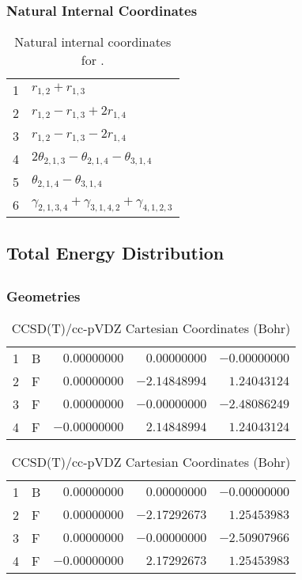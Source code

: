 \documentclass[10pt,oneside]{article}
\begin{document}
\begin{table}[h!]
\subsubsection*{Natural Internal Coordinates}
\centering
\caption{Natural internal coordinates for .}
\small
\begin{tabular}{ll}
\toprule
  1   & $r_{1,2} + r_{1,3}$ \\
  2   & $r_{1,2} - r_{1,3} + 2r_{1,4}$ \\
  3   & $r_{1,2} - r_{1,3} - 2r_{1,4}$ \\
  4   & $2\theta_{2,1,3} - \theta_{2,1,4} - \theta_{3,1,4}$ \\
  5   & $\theta_{2,1,4} - \theta_{3,1,4}$ \\
  6   & $\gamma_{2,1,3,4} + \gamma_{3,1,4,2} + \gamma_{4,1,2,3}$ \\
\bottomrule
\end{tabular}
\end{table}

\begin{table}
\subsection*{Total Energy Distribution}
\centering\end{table}

\clearpage

\subsection{}

\begin{table}[h!]
\subsubsection*{Geometries}
\begin{multicols}{2}
\centering
\caption{CCSD(T)/cc-pVTZ Cartesian Coordinates (Bohr)}
\begin{tabular}{llrrr}
\toprule
1  & B  & $ 0.00000000$ & $ 0.00000000$ & $-0.00000000$ \\
2  & F  & $ 0.00000000$ & $-2.14848994$ & $ 1.24043124$ \\
3  & F  & $ 0.00000000$ & $-0.00000000$ & $-2.48086249$ \\
4  & F  & $-0.00000000$ & $ 2.14848994$ & $ 1.24043124$ \\
\bottomrule
\end{tabular}
\caption{CCSD(T)/cc-pVDZ Cartesian Coordinates (Bohr)}
\begin{tabular}{llrrr}
\toprule
1  & B  & $ 0.00000000$ & $ 0.00000000$ & $-0.00000000$ \\
2  & F  & $ 0.00000000$ & $-2.17292673$ & $ 1.25453983$ \\
3  & F  & $ 0.00000000$ & $-0.00000000$ & $-2.50907966$ \\
4  & F  & $-0.00000000$ & $ 2.17292673$ & $ 1.25453983$ \\
\bottomrule
\end{tabular}
\end{multicols}
\end{table}
\end{document}
